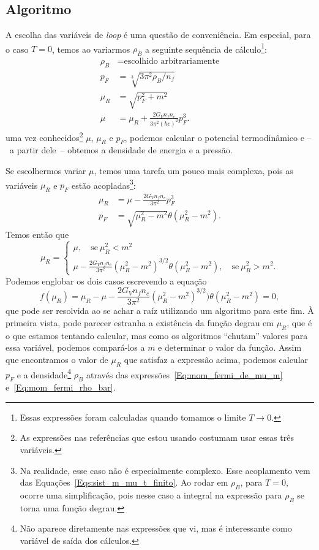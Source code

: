 \subsection{Algoritmo}

A escolha das variáveis de \emph{loop} é uma questão de conveniência. Em especial, para o caso $T = 0$, temos ao variarmos $\rho_B$ a seguinte sequência de cálculo\footnote{Essas expressões foram calculadas quando tomamos o limite $T \to 0$.}:
\begin{align}
	\rho_B &= \textrm{escolhido arbitrariamente} \\
	p_F &= \sqrt[3]{3 \pi^2 \rho_B / n_f} \label{Eq:mom_fermi_rho_bar}\\
	\mu_R &= \sqrt{p_F^2 + m^2} \label{Eq:pot_quim_renorm_loop_dens_bar}\\
	\mu &= \mu_R + \frac{2 G_V n_f n_c}{3\pi^2(\hbar c)^2} p_F^3.
\end{align}
%
uma vez conhecidos\footnote{As expressões nas referências que estou usando costumam usar essas três variáveis.} $\mu$, $\mu_R$ e $p_F$, podemos calcular o potencial termodinâmico e --~a partir dele~-- obtemos a densidade de energia e a pressão.

Se escolhermos variar $\mu$, temos uma tarefa um pouco mais complexa, pois as variáveis $\mu_R$ e $p_F$ estão acopladas\footnote{Na realidade, esse caso não é especialmente complexo. Esse acoplamento vem das Equações~\eqref{Eqs:sist_m_mu_t_finito}. Ao rodar em $\rho_B$, para $T = 0$, ocorre uma simplificação, pois nesse caso a integral na expressão para $\rho_B$ se torna uma função degrau.}:
\begin{align}
	\mu_R &= \mu - \frac{2 G_V n_f n_c}{3\pi^2} p_F^3 \\
	p_F & = \sqrt{\mu_R^2 - m^2} \theta(\mu_R^2 - m^2). \label{Eq:mom_fermi_de_mu_m}
\end{align}
%
Temos então que
\begin{equation}
	\mu_R = \begin{cases} \mu, \quad\textrm{se}~\mu_R^2 < m^2 \\ \mu - \frac{2 G_V n_f n_c}{3\pi^2} (\mu_R^2 - m^2)^{3/2} \theta(\mu_R^2 - m^2), \quad\textrm{se}~\mu_R^2 > m^2.\end{cases}
\end{equation}
%
Podemos englobar os dois casos escrevendo a equação
\begin{equation}
	f(\mu_R) = \mu_R - \mu - \frac{2 G_V n_f n_c}{3\pi^2} (\mu_R^2 - m^2)^{3/2}) \theta(\mu_R^2 - m^2) = 0,
\end{equation}
%
que pode ser resolvida ao se achar a raíz utilizando um algoritmo para este fim. À primeira vista, pode parecer estranha a existência da função degrau em $\mu_R$, que é o que estamos tentando calcular, mas como os algoritmos ``chutam'' valores para essa variável, podemos compará-los a $m$ e determinar o valor da função. Assim que encontramos o valor de $\mu_R$ que satisfaz a expressão acima, podemos calcular $p_F$ e a densidade\footnote{Não aparece diretamente nas expressões que vi, mas é interessante como variável de saída dos cálculos.} $\rho_B$ através das expressões~\eqref{Eq:mom_fermi_de_mu_m} e~\eqref{Eq:mom_fermi_rho_bar}.

